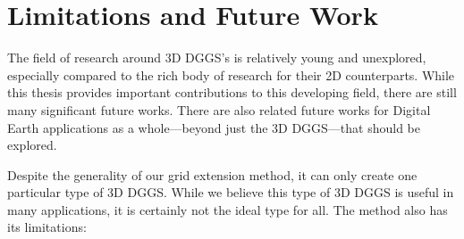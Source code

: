 \section{Limitations and Future Work}
The field of research around 3D DGGS's is relatively young and unexplored, especially compared to the rich body of research for their 2D counterparts.
While this thesis provides important contributions to this developing field, there are still many significant future works.
There are also related future works for Digital Earth applications as a whole---beyond just the 3D DGGS---that should be explored.


Despite the generality of our grid extension method, it can only create one particular type of 3D DGGS.
While we believe this type of 3D DGGS is useful in many applications, it is certainly not the ideal type for all.
The method also has its limitations:
%

